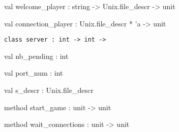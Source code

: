 \documentclass[11pt]{article}
\begin{document}
\label{val:Server.welcome-underscoreplayer}\begin{ocamldoccode}
val welcome_player : string -> Unix.file_descr -> unit
\end{ocamldoccode}




\label{val:Server.connection-underscoreplayer}\begin{ocamldoccode}
val connection_player : Unix.file_descr * 'a -> unit
\end{ocamldoccode}




\begin{ocamldoccode}
{\tt{class server : }}{\tt{int -> int -> }}\end{ocamldoccode}
\label{class:Server.server}

\begin{ocamldocobjectend}


\label{val:Server.server.nb-underscorepending}\begin{ocamldoccode}
val nb_pending : int
\end{ocamldoccode}


\label{val:Server.server.port-underscorenum}\begin{ocamldoccode}
val port_num : int
\end{ocamldoccode}


\label{val:Server.server.s-underscoredescr}\begin{ocamldoccode}
val s_descr : Unix.file_descr
\end{ocamldoccode}


\label{method:Server.server.start-underscoregame}\begin{ocamldoccode}
method start_game : unit -> unit
\end{ocamldoccode}


\label{method:Server.server.wait-underscoreconnections}\begin{ocamldoccode}
method wait_connections : unit -> unit
\end{ocamldoccode}
\end{ocamldocobjectend}
\end{document}
